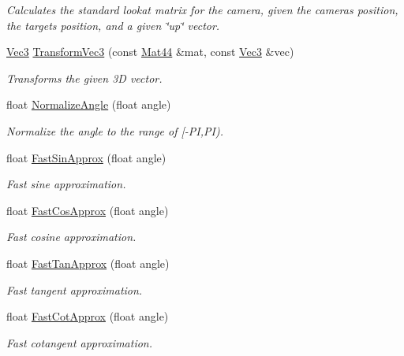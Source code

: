 \begin{DoxyCompactItemize}
\begin{DoxyCompactList}\small\item\em Calculates the standard lookat matrix for the camera, given the camera\textquotesingle{}s position, the target\textquotesingle{}s position, and a given \char`\"{}up\char`\"{} vector. \end{DoxyCompactList}\item 
\hyperlink{classgofxmath_1_1_vec3}{Vec3} \hyperlink{namespacegofxmath_a503b30792d41234b29089176be81cf6c}{Transform\+Vec3} (const \hyperlink{classgofxmath_1_1_mat44}{Mat44} \&mat, const \hyperlink{classgofxmath_1_1_vec3}{Vec3} \&vec)
\begin{DoxyCompactList}\small\item\em Transforms the given 3\+D vector. \end{DoxyCompactList}\item 
float \hyperlink{group___s_i_s_d_scalar_math_ga53debb59a36f436520d9f8696fb5af17}{Normalize\+Angle} (float angle)
\begin{DoxyCompactList}\small\item\em Normalize the angle to the range of \mbox{[}-\/\+P\+I,P\+I). \end{DoxyCompactList}\item 
float \hyperlink{group___s_i_s_d_scalar_math_gacda965689f172d535fcea8ca52a28358}{Fast\+Sin\+Approx} (float angle)
\begin{DoxyCompactList}\small\item\em Fast sine approximation. \end{DoxyCompactList}\item 
float \hyperlink{group___s_i_s_d_scalar_math_ga225f52235ddb3aac0be7405e966df40e}{Fast\+Cos\+Approx} (float angle)
\begin{DoxyCompactList}\small\item\em Fast cosine approximation. \end{DoxyCompactList}\item 
float \hyperlink{group___s_i_s_d_scalar_math_ga29cc2127c4bb018c147006a618baf5f3}{Fast\+Tan\+Approx} (float angle)
\begin{DoxyCompactList}\small\item\em Fast tangent approximation. \end{DoxyCompactList}\item 
float \hyperlink{group___s_i_s_d_scalar_math_gabd664af8218cb91dc9b74786a054f45a}{Fast\+Cot\+Approx} (float angle)
\begin{DoxyCompactList}\small\item\em Fast cotangent approximation. \end{DoxyCompactList}\item 

\end{DoxyCompactItemize}
